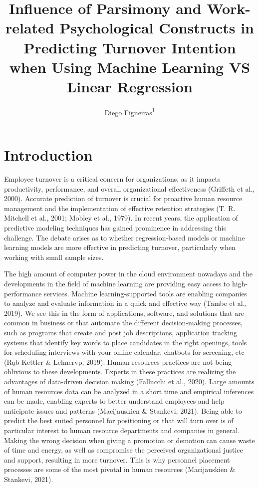 \documentclass[
  jou]{apa6}
\title{Influence of Parsimony and Work-related Psychological Constructs in Predicting Turnover Intention when Using Machine Learning VS Linear Regression}
\author{Diego Figueiras\textsuperscript{1}}
\date{}
\affiliation{\vspace{0.5cm}\textsuperscript{1} Montclai State University}
\begin{document}
\maketitle

\hypertarget{introduction}{%
\section{Introduction}\label{introduction}}

Employee turnover is a critical concern for organizations, as it impacts productivity, performance, and overall organizational effectiveness (Griffeth et al., 2000).
Accurate prediction of turnover is crucial for proactive human resource management and the implementation of effective retention strategies (T. R. Mitchell et al., 2001; Mobley et al., 1979).
In recent years, the application of predictive modeling techniques has gained prominence in addressing this challenge.
The debate arises as to whether regression-based models or machine learning models are more effective in predicting turnover, particularly when working with small sample sizes.

The high amount of computer power in the cloud environment nowadays and the developments in the field of machine learning are providing easy access to high-performance services.
Machine learning-supported tools are enabling companies to analyze and evaluate information in a quick and effective way (Tambe et al., 2019).
We see this in the form of applications, software, and solutions that are common in business or that automate the different decision-making processes, such as programs that create and post job descriptions, application tracking systems that identify key words to place candidates in the right openings, tools for scheduling interviews with your online calendar, chatbots for screening, etc (Rąb-Kettler \& Lehnervp, 2019).
Human resources practices are not being oblivious to these developments.
Experts in these practices are realizing the advantages of data-driven decision making (Fallucchi et al., 2020).
Large amounts of human resources data can be analyzed in a short time and empirical inferences can be made, enabling experts to better understand employees and help anticipate issues and patterns (Macijauskien \& Stankevi, 2021).
Being able to predict the best suited personnel for positioning or that will turn over is of particular interest to human resource departments and companies in general.
Making the wrong decision when giving a promotion or demotion can cause waste of time and energy, as well as compromise the perceived organizational justice and support, resulting in more turnover.
This is why personnel placement processes are some of the most pivotal in human resources (Macijauskien \& Stankevi, 2021).
\end{document}
